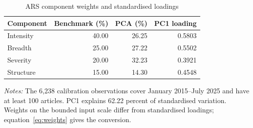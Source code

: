 \begin{table}[htbp]\centering\small\singlespacing
\caption{ARS component weights and standardised loadings}\label{tab:component_weights_full}
\setlength{\tabcolsep}{4pt}
\begin{tabular}{lrrr}\toprule
Component & Benchmark (\%) & PCA (\%) & PC1 loading\\\midrule
Intensity & 40.00 & 26.25 & 0.5803\\
Breadth & 25.00 & 27.22 & 0.5502\\
Severity & 20.00 & 32.23 & 0.3921\\
Structure & 15.00 & 14.30 & 0.4548\\
\bottomrule\end{tabular}
\par\medskip\raggedright\footnotesize\textit{Notes:} The 6,238 calibration observations cover January 2015--July 2025 and have at least 100 articles. PC1 explains 62.22 percent of standardised variation. Weights on the bounded input scale differ from standardised loadings; equation~\eqref{eq:weights} gives the conversion.
\end{table}